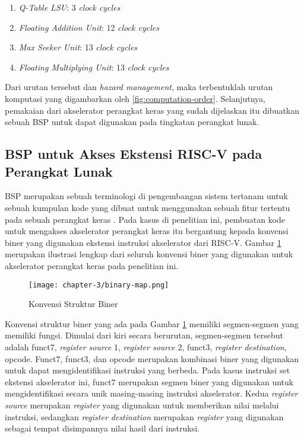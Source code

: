 \begin{enumerate}
	\item \textit{Q-Table LSU}: 3 \textit{clock cycles}
	\item \textit{Floating Addition Unit}: 12 \textit{clock cycles}
	\item \textit{Max Seeker Unit}: 13 \textit{clock cycles}
	\item \textit{Floating Multiplying Unit}: 13 \textit{clock cycles}
\end{enumerate}

Dari urutan tersebut dan \textit{hazard management}, maka terbentuklah urutan komputasi yang digambarkan oleh \ref{fig:computation-order}. Selanjutnya, pemakaian dari akselerator perangkat keras yang sudah dijelaskan itu dibuatkan sebuah \ac{BSP} untuk dapat digunakan pada tingkatan perangkat lunak.

\subsection{\ac{BSP} untuk Akses Ekstensi RISC-V pada Perangkat Lunak}

\acf{BSP} merupakan sebuah terminologi di pengembangan sistem tertanam untuk sebuah kumpulan kode yang dibuat untuk menggunakan sebuah fitur tertentu pada sebuah perangkat keras \parencite{xin2021firmware}. Pada kasus di penelitian ini, pembuatan kode untuk mengakses akselerator perangkat keras itu bergantung kepada konvensi biner yang digunakan ekstensi instruksi akselerator dari RISC-V. Gambar \ref{fig:binary-map} merupakan ilustrasi lengkap dari seluruh konvensi biner yang digunakan untuk akselerator perangkat keras pada penelitian ini.

\begin{figure}[H]
	\centering
	\texttt{[image: chapter-3/binary-map.png]}
	\caption{Konvensi Struktur Biner}
	\label{fig:binary-map}
\end{figure}

Konvensi struktur biner yang ada pada Gambar \ref{fig:binary-map} memiliki segmen-segmen yang memiliki fungsi. Dimulai dari kiri secara berurutan, segmen-segmen tersebut adalah funct7, \textit{register source} 1, \textit{register source} 2, funct3, \textit{register destination}, opcode. Funct7, funct3, dan opcode merupakan kombinasi biner yang digunakan untuk dapat mengidentifikasi instruksi yang berbeda. Pada kasus instruksi set ekstensi akselerator ini, funct7 merupakan segmen biner yang digunakan untuk mengidentifikasi secara unik masing-masing instruksi akselerator. Kedua \textit{register source} merupakan \textit{register} yang digunakan untuk memberikan nilai melalui instruksi, sedangkan \textit{register destination} merupakan \textit{register} yang digunakan sebagai tempat disimpannya nilai hasil dari instruksi.


